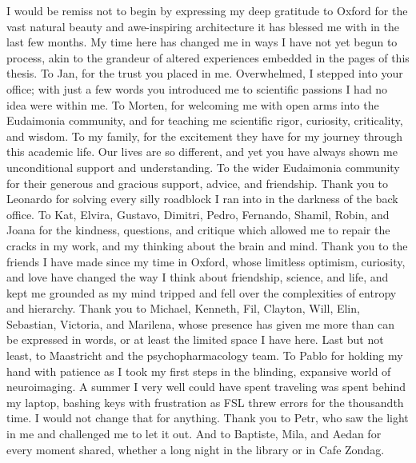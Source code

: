 \begin{acknowledgements}

I would be remiss not to begin by expressing my deep gratitude to Oxford for the vast natural beauty and awe-inspiring architecture it has blessed me with in the last few months. My time here has changed me in ways I have not yet begun to process, akin to the grandeur of altered experiences embedded in the pages of this thesis. To Jan, for the trust you placed in me. Overwhelmed, I stepped into your office;  with just a few words you introduced me to scientific passions I had no idea were within me. To Morten, for welcoming me with open arms into the Eudaimonia community, and for teaching me scientific rigor, curiosity, criticality, and wisdom. To my family, for the excitement they have for my journey through this academic life. Our lives are so different, and yet you have always shown me unconditional support and understanding. To the wider Eudaimonia community for their generous and gracious support, advice, and friendship. Thank you to Leonardo for solving every silly roadblock I ran into in the darkness of the back office. To Kat, Elvira, Gustavo, Dimitri, Pedro, Fernando, Shamil, Robin, and Joana for the kindness, questions, and critique which allowed me to repair the cracks in my work, and my thinking about the brain and mind. Thank you to the friends I have made since my time in Oxford, whose limitless optimism, curiosity, and love have changed the way I think about friendship, science, and life, and kept me grounded as my mind tripped and fell over the complexities of entropy and hierarchy. Thank you to Michael, Kenneth, Fil, Clayton, Will, Elin, Sebastian, Victoria, and Marilena, whose presence has given me more than can be expressed in words, or at least the limited space I have here. Last but not least, to Maastricht and the psychopharmacology team. To Pablo for holding my hand with patience as I took my first steps in the blinding, expansive world of neuroimaging. A summer I very well could have spent traveling was spent behind my laptop, bashing keys with frustration as FSL threw errors for the thousandth time. I would not change that for anything. Thank you to Petr, who saw the light in me and challenged me to let it out. And to Baptiste, Mila, and Aedan for every moment shared, whether a long night in the library or in Cafe Zondag.
\end{acknowledgements}